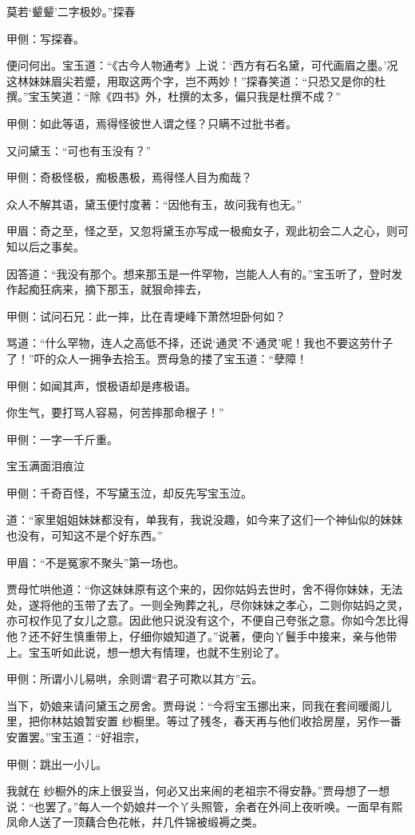 \begin{parag}
莫若‘颦颦’二字极妙。”探春\begin{note}甲侧：写探春。\end{note}便问何出。宝玉道：“《古今人物通考》上说：‘西方有石名黛，可代画眉之墨。’况这林妹妹眉尖若蹙，用取这两个字，岂不两妙！”探春笑道：“只恐又是你的杜撰。”宝玉笑道：“除《四书》外，杜撰的太多，偏只我是杜撰不成？”\begin{note}甲侧：如此等语，焉得怪彼世人谓之怪？只瞒不过批书者。\end{note}又问黛玉：“可也有玉没有？”\begin{note}甲侧：奇极怪极，痴极愚极，焉得怪人目为痴哉？\end{note}众人不解其语，黛玉便忖度著：“因他有玉，故问我有也无。”\begin{note}甲眉：奇之至，怪之至，又忽将黛玉亦写成一极痴女子，观此初会二人之心，则可知以后之事矣。\end{note}因答道：“我没有那个。想来那玉是一件罕物，岂能人人有的。”宝玉听了，登时发作起痴狂病来，摘下那玉，就狠命摔去，\begin{note}甲侧：试问石兄：此一摔，比在青埂峰下萧然坦卧何如？\end{note}骂道：“什么罕物，连人之高低不择，还说‘通灵’不‘通灵’呢！我也不要这劳什子了！”吓的众人一拥争去拾玉。贾母急的搂了宝玉道：“孽障！\begin{note}甲侧：如闻其声，恨极语却是疼极语。\end{note}你生气，要打骂人容易，何苦摔那命根子！”\begin{note}甲侧：一字一千斤重。\end{note}宝玉满面泪痕泣\begin{note}甲侧：千奇百怪，不写黛玉泣，却反先写宝玉泣。\end{note}道：“家里姐姐妹妹都没有，单我有，我说没趣，如今来了这们一个神仙似的妹妹也没有，可知这不是个好东西。”\begin{note}甲眉：“不是冤家不聚头”第一场也。\end{note}贾母忙哄他道：“你这妹妹原有这个来的，因你姑妈去世时，舍不得你妹妹，无法处，遂将他的玉带了去了。一则全殉葬之礼，尽你妹妹之孝心，二则你姑妈之灵，亦可权作见了女儿之意。因此他只说没有这个，不便自己夸张之意。你如今怎比得他？还不好生慎重带上，仔细你娘知道了。”说著，便向丫鬟手中接来，亲与他带上。宝玉听如此说，想一想大有情理，也就不生别论了。\begin{note}甲侧：所谓小儿易哄，余则谓“君子可欺以其方”云。\end{note}
\end{parag}


\begin{parag}
    当下，奶娘来请问黛玉之房舍。贾母说：“今将宝玉挪出来，同我在套间暖阁儿里，把你林姑娘暂安置  纱橱里。等过了残冬，春天再与他们收拾房屋，另作一番安置罢。”宝玉道：“好祖宗，\begin{note}甲侧：跳出一小儿。\end{note}我就在  纱橱外的床上很妥当，何必又出来闹的老祖宗不得安静。”贾母想了一想说：“也罢了。”每人一个奶娘幷一个丫头照管，余者在外间上夜听唤。一面早有熙凤命人送了一顶藕合色花帐，幷几件锦被缎褥之类。
\end{parag}


